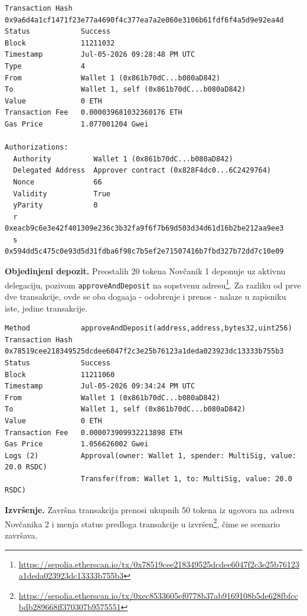 \newpage

\begin{lstlisting}[caption={Transakcija 3: \en{EIP-7702}{} delegacija}, label={lst:onchain-tx3}]
Transaction Hash  0x9a6d4a1cf1471f23e77a4690f4c377ea7a2e060e3106b61fdf6f4a5d9e92ea4d
Status            Success
Block             11211032
Timestamp         Jul-05-2026 09:28:48 PM UTC
Type              4
From              Wallet 1 (0x861b70dC...b080aD842)
To                Wallet 1, self (0x861b70dC...b080aD842)
Value             0 ETH
Transaction Fee   0.000039681032360176 ETH
Gas Price         1.077001204 Gwei

Authorizations:
  Authority          Wallet 1 (0x861b70dC...b080aD842)
  Delegated Address  Approver contract (0x828F4dc0...6C2429764)
  Nonce              66
  Validity           True
  yParity            0
  r                  0xeacb9c6e3e42f401309e236c3b32fa9f6f7b69d503d34d61d16b2be212aa9ee3
  s                  0x594dd5c475c0e93d5d31fdba6f98c7b5ef2e71507416b7fbd327b72dd7c10e09
\end{lstlisting}

\textbf{Objedinjeni depozit.} Preostalih 20  tokena Nov\v canik 1 deponuje uz aktivnu delegaciju, pozivom \texttt{approveAndDeposit} na sopstvenu adresu\footnote{\url{https://sepolia.etherscan.io/tx/0x78519cee218349525dcdee6047f2c3e25b76123a1deda023923dc13333b755b3}}. Za razliku od prve dve transakcije, ovde se oba doga\dj aja - odobrenje i prenos - nalaze u zapisniku iste, jedine transakcije.

\newpage

\begin{lstlisting}[caption={Transakcija 4: objedinjeni depozit (\texttt{approveAndDeposit})}, label={lst:onchain-tx4}]
Method            approveAndDeposit(address,address,bytes32,uint256)
Transaction Hash  0x78519cee218349525dcdee6047f2c3e25b76123a1deda023923dc13333b755b3
Status            Success
Block             11211060
Timestamp         Jul-05-2026 09:34:24 PM UTC
From              Wallet 1 (0x861b70dC...b080aD842)
To                Wallet 1, self (0x861b70dC...b080aD842)
Value             0 ETH
Transaction Fee   0.000073909932213898 ETH
Gas Price         1.056626002 Gwei
Logs (2)          Approval(owner: Wallet 1, spender: MultiSig, value: 20.0 RSDC)
                  Transfer(from: Wallet 1, to: MultiSig, value: 20.0 RSDC)
\end{lstlisting}

\textbf{Izvr\v senje.} Zavr\v sna transakcija prenosi ukupnih 50  tokena iz ugovora na adresu Nov\v canika 2 i menja status predloga transakcije u izvr\v sen\footnote{\url{https://sepolia.etherscan.io/tx/0xec8533605ef0778b37ab9169108b5de628fbfccbdb289668ff370307b9575551}}, \v cime se scenario zavr\v sava.

